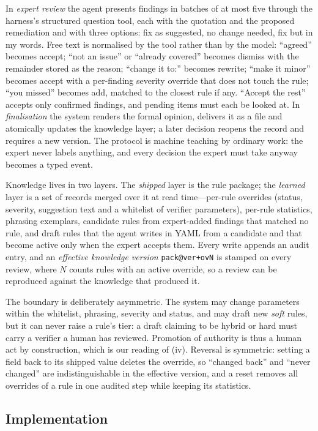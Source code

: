 \documentclass{IOS-Book-Article}
\begin{document}
In \emph{expert review} the agent presents findings in batches of at most five through the harness's structured question tool, each with the quotation and the proposed remediation and with three options: fix as suggested, no change needed, fix but in my words. Free text is normalised by the tool rather than by the model: ``agreed'' becomes accept; ``not an issue'' or ``already covered'' becomes dismiss with the remainder stored as the reason; ``change it to:'' becomes rewrite; ``make it minor'' becomes accept with a per-finding severity override that does not touch the rule; ``you missed'' becomes add, matched to the closest rule if any. ``Accept the rest'' accepts only confirmed findings, and pending items must each be looked at. In \emph{finalisation} the system renders the formal opinion, delivers it as a file and atomically updates the knowledge layer; a later decision reopens the record and requires a new version. The protocol is machine teaching by ordinary work: the expert never labels anything, and every decision the expert must take anyway becomes a typed event.

Knowledge lives in two layers. The \emph{shipped} layer is the rule package; the \emph{learned} layer is a set of records merged over it at read time---per-rule overrides (status, severity, suggestion text and a whitelist of verifier parameters), per-rule statistics, phrasing exemplars, candidate rules from expert-added findings that matched no rule, and draft rules that the agent writes in YAML from a candidate and that become active only when the expert accepts them. Every write appends an audit entry, and an \emph{effective knowledge version} \texttt{pack@ver+ovN} is stamped on every review, where $N$ counts rules with an active override, so a review can be reproduced against the knowledge that produced it.

The boundary is deliberately asymmetric. The system may change parameters within the whitelist, phrasing, severity and status, and may draft new \emph{soft} rules, but it can never raise a rule's tier: a draft claiming to be hybrid or hard must carry a verifier a human has reviewed. Promotion of authority is thus a human act by construction, which is our reading of (iv). Reversal is symmetric: setting a field back to its shipped value deletes the override, so ``changed back'' and ``never changed'' are indistinguishable in the effective version, and a reset removes all overrides of a rule in one audited step while keeping its statistics.

\subsection{Implementation}
\end{document}
